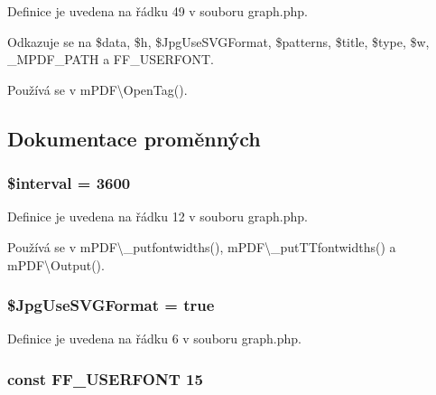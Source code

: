 Definice je uvedena na řádku 49 v souboru graph.\-php.



Odkazuje se na \$data, \$h, \$\-Jpg\-Use\-S\-V\-G\-Format, \$patterns, \$title, \$type, \$w, \-\_\-\-M\-P\-D\-F\-\_\-\-P\-A\-T\-H a F\-F\-\_\-\-U\-S\-E\-R\-F\-O\-N\-T.



Používá se v m\-P\-D\-F\textbackslash{}\-Open\-Tag().



\subsection{Dokumentace proměnných}
\hypertarget{graph_8php_a02df6fd14302ba88fecc15b95d513e5b}{
\subsubsection[{\$interval}]{\setlength{\rightskip}{0pt plus 5cm}\$interval = 3600}}\label{graph_8php_a02df6fd14302ba88fecc15b95d513e5b}


Definice je uvedena na řádku 12 v souboru graph.\-php.



Používá se v m\-P\-D\-F\textbackslash{}\-\_\-putfontwidths(), m\-P\-D\-F\textbackslash{}\-\_\-put\-T\-Tfontwidths() a m\-P\-D\-F\textbackslash{}\-Output().

\hypertarget{graph_8php_a4767d5ef05aa1f95f7a64c0aa8f26ccc}{
\subsubsection[{\$\-Jpg\-Use\-S\-V\-G\-Format}]{\setlength{\rightskip}{0pt plus 5cm}\$Jpg\-Use\-S\-V\-G\-Format = true}}\label{graph_8php_a4767d5ef05aa1f95f7a64c0aa8f26ccc}


Definice je uvedena na řádku 6 v souboru graph.\-php.

\hypertarget{graph_8php_a40bfaf7ca9956a554a5b2b9beff2ad62}{
\subsubsection[{F\-F\-\_\-\-U\-S\-E\-R\-F\-O\-N\-T}]{\setlength{\rightskip}{0pt plus 5cm}const F\-F\-\_\-\-U\-S\-E\-R\-F\-O\-N\-T 15}}\label{graph_8php_a40bfaf7ca9956a554a5b2b9beff2ad62}


